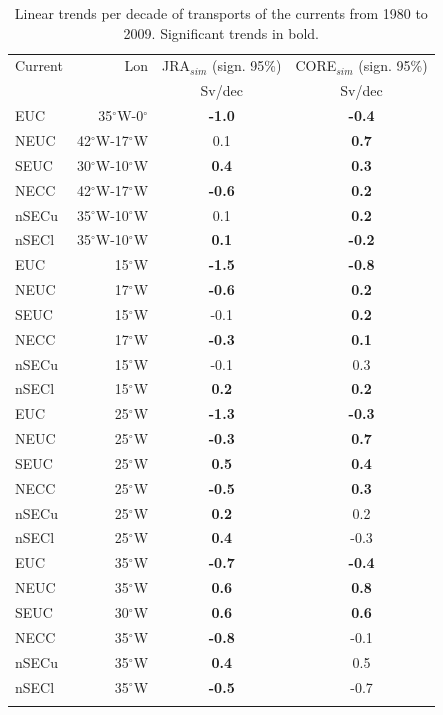 \documentclass[os, manuscript]{copernicus}
\begin{document}
\begin{table}[t]
	\caption{Linear trends per decade of transports of the currents from 1980 to 2009. Significant trends in bold.\\
	}
	\centering
	\begin{tabular}{lrcc}
		\tophline
		Current & Lon & JRA$_{sim}$ (sign. 95\%) & CORE$_{sim}$ (sign. 95\%)\\
		&&Sv/dec&Sv/dec\\
		\middlehline
		EUC  & 35$^{\circ}$W-0$^{\circ}$ & \textbf{-1.0}  	& \textbf{-0.4}  \\
		NEUC & 42$^{\circ}$W-17$^{\circ}$W & 0.1 			& \textbf{0.7}  \\
		SEUC & 30$^{\circ}$W-10$^{\circ}$W & \textbf{0.4}  	& \textbf{0.3}  \\
		NECC & 42$^{\circ}$W-17$^{\circ}$W & \textbf{-0.6}  	& \textbf{0.2}  \\
		nSECu & 35$^{\circ}$W-10$^{\circ}$W  & 0.1 			&\textbf{ 0.2}  \\
		nSECl  & 35$^{\circ}$W-10$^{\circ}$W & \textbf{0.1}  	& \textbf{-0.2}  \\
		\middlehline
		EUC & 15$^{\circ}$W & \textbf{-1.5}  		& \textbf{-0.8}  \\
		NEUC & 17$^{\circ}$W & \textbf{-0.6}  	& \textbf{0.2}  \\
		SEUC & 15$^{\circ}$W & -0.1 			& \textbf{0.2}  \\
		NECC & 17$^{\circ}$W & \textbf{-0.3}  	& \textbf{0.1}  \\
		nSECu & 15$^{\circ}$W & -0.1 			& 0.3 \\
		nSECl & 15$^{\circ}$W & \textbf{0.2}  	& \textbf{0.2}\\
		\middlehline
		EUC & 25$^{\circ}$W & \textbf{-1.3}  & \textbf{-0.3}  \\
		NEUC & 25$^{\circ}$W & \textbf{-0.3}  &\textbf{ 0.7}  \\
		SEUC & 25$^{\circ}$W & \textbf{0.5}  & \textbf{0.4}  \\
		NECC & 25$^{\circ}$W & \textbf{-0.5}  & \textbf{0.3}  \\
		nSECu & 25$^{\circ}$W & \textbf{0.2}  & 0.2 \\
		nSECl & 25$^{\circ}$W & \textbf{0.4}  & -0.3 \\
		\middlehline
		EUC & 35$^{\circ}$W & \textbf{-0.7 } & \textbf{-0.4}  \\
		NEUC & 35$^{\circ}$W & \textbf{0.6}  &\textbf{ 0.8}  \\
		SEUC & 30$^{\circ}$W & \textbf{0.6}  & \textbf{0.6}  \\
		NECC & 35$^{\circ}$W & \textbf{-0.8}  & -0.1 \\
		nSECu & 35$^{\circ}$W & \textbf{0.4}  & 0.5 \\
		nSECl & 35$^{\circ}$W & \textbf{-0.5}  & -0.7 \\
		\bottomhline
	\end{tabular}
	\label{tab_trends_INT}
\end{table}
\end{document}
